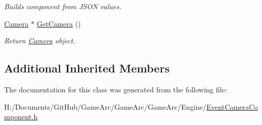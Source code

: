 \begin{DoxyCompactItemize}
\begin{DoxyCompactList}\small\item\em Builds component from J\+S\+O\+N values. \end{DoxyCompactList}\item 
\hypertarget{class_event_camera_component_ae8ffe14e924fbd153eb2101acf180fed}{\hyperlink{class_camera}{Camera} $\ast$ \hyperlink{class_event_camera_component_ae8ffe14e924fbd153eb2101acf180fed}{Get\+Camera} ()}\label{class_event_camera_component_ae8ffe14e924fbd153eb2101acf180fed}

\begin{DoxyCompactList}\small\item\em Return \hyperlink{class_camera}{Camera} object. \end{DoxyCompactList}\end{DoxyCompactItemize}
\subsection*{Additional Inherited Members}


The documentation for this class was generated from the following file\+:\begin{DoxyCompactItemize}
\item 
H\+:/\+Documents/\+Git\+Hub/\+Game\+Arc/\+Game\+Arc/\+Game\+Arc/\+Engine/\hyperlink{_event_camera_component_8h}{Event\+Camera\+Component.\+h}\end{DoxyCompactItemize}
